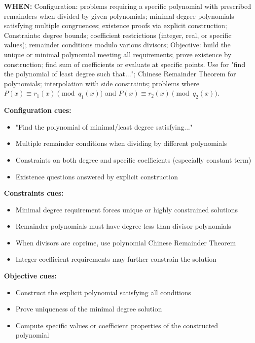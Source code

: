 \documentclass[12pt]{article}
\begin{document}
\textbf{WHEN:} Configuration: problems requiring a specific polynomial with prescribed remainders when divided by given polynomials; minimal degree polynomials satisfying multiple congruences; existence proofs via explicit construction; Constraints: degree bounds; coefficient restrictions (integer, real, or specific values); remainder conditions modulo various divisors; Objective: build the unique or minimal polynomial meeting all requirements; prove existence by construction; find sum of coefficients or evaluate at specific points. Use for "find the polynomial of least degree such that..."; Chinese Remainder Theorem for polynomials; interpolation with side constraints; problems where $P(x) \equiv r_1(x) \pmod{q_1(x)}$ and $P(x) \equiv r_2(x) \pmod{q_2(x)}$.

\textbf{Configuration cues:}
\begin{itemize}
    \item "Find the polynomial of minimal/least degree satisfying..."
    \item Multiple remainder conditions when dividing by different polynomials
    \item Constraints on both degree and specific coefficients (especially constant term)
    \item Existence questions answered by explicit construction
\end{itemize}

\textbf{Constraints cues:}
\begin{itemize}
    \item Minimal degree requirement forces unique or highly constrained solutions
    \item Remainder polynomials must have degree less than divisor polynomials
    \item When divisors are coprime, use polynomial Chinese Remainder Theorem
    \item Integer coefficient requirements may further constrain the solution
\end{itemize}

\textbf{Objective cues:}
\begin{itemize}
    \item Construct the explicit polynomial satisfying all conditions
    \item Prove uniqueness of the minimal degree solution
    \item Compute specific values or coefficient properties of the constructed polynomial
\end{itemize}
\end{document}
